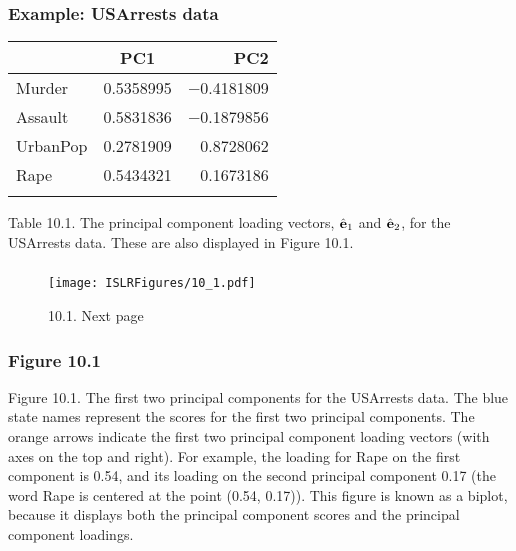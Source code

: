 \documentclass{beamer}
\begin{document}
    \begin{frame}
    	\frametitle{ Example: USArrests data}
    \begin{center}
    	\begin{tabular}{ l   c   r }
    		\hline
    	      & PC1 & PC2  \\ \hline
    	      Murder & 0.5358995 &  −0.4181809 \\
    	      Assault  & 0.5831836 &−0.1879856\\
    	      UrbanPop &0.2781909& 0.8728062\\
    	      Rape &0.5434321 &0.1673186\\
    		\hline \\
    	\end{tabular}
    	\end{center}
     	 
     	{Table 10.1. The principal component loading vectors, $\hat{\bf e}_1$  and
     		$\hat{\bf e}_2$, for the
     		USArrests data. These are also displayed in Figure 10.1. } 
    \end{frame}   
            
    
    \begin{frame}
    	\frametitle{ }
    	\begin{figure}
    		\centering
    		\texttt{[image: ISLRFigures/10\_1.pdf]}
    		\caption{\scriptsize 10.1.  Next page
    		}
    	\end{figure}
    \end{frame}
    
     
     \begin{frame}
     	\frametitle{Figure 10.1 }
      
     		  Figure 10.1. The first two principal components for the USArrests data. The
     			blue state names represent the scores for the first two principal components. The
     			orange arrows indicate the first two principal component loading vectors (with
     			axes on the top and right). For example, the loading for Rape on the first component
     			is 0.54, and its loading on the second principal component 0.17 (the word
     			Rape is centered at the point (0.54, 0.17)). This figure is known as a biplot, because
     			it displays both the principal component scores and the principal component
     			loadings.
     	 
      
     \end{frame}
  
\end{document}
